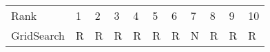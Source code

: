 \begin{tabular}{lllllllllll}
Rank & 1 & 2 & 3 & 4 & 5 & 6 & 7 & 8 & 9 & 10 \\
GridSearch & R & R & R & R & R & R & N & R & R & R \\
\end{tabular}
